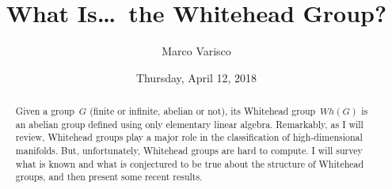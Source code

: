 \documentclass{UAmathtalk}
\author{Marco Varisco}
\title{What Is\ldots\ the Whitehead Group?}
\date{Thursday, April 12, 2018}
\begin{document}
\maketitle

\begin{abstract}
Given a group~$G$ (finite or infinite, abelian or not), its Whitehead group~$\mathit{Wh}(G)$ is an abelian group defined using only elementary linear algebra. Remarkably, as I will review, Whitehead groups play a major role in the classification of high-dimensional manifolds. But, unfortunately, Whitehead groups are hard to compute. I will survey what is known and what is conjectured to be true about the structure of Whitehead groups, and then present some recent results.
\end{abstract}
\end{document}
